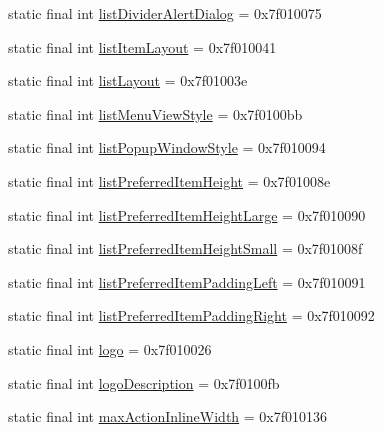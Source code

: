 \begin{CompactItemize}
\item 
static final int \hyperlink{classandroid_1_1support_1_1graphics_1_1drawable_1_1_r_1_1attr_78af25252cbf0570ca0942b1d8a57af0}{listDividerAlertDialog} = 0x7f010075
\item 
static final int \hyperlink{classandroid_1_1support_1_1graphics_1_1drawable_1_1_r_1_1attr_351fa26f9f498f2c645ec7794e1f63a6}{listItemLayout} = 0x7f010041
\item 
static final int \hyperlink{classandroid_1_1support_1_1graphics_1_1drawable_1_1_r_1_1attr_748eaba4836f9fd07dccf78906f08c5b}{listLayout} = 0x7f01003e
\item 
static final int \hyperlink{classandroid_1_1support_1_1graphics_1_1drawable_1_1_r_1_1attr_1b05baff6c902ad44ecb49595c2ac79e}{listMenuViewStyle} = 0x7f0100bb
\item 
static final int \hyperlink{classandroid_1_1support_1_1graphics_1_1drawable_1_1_r_1_1attr_e660de6762e0889d330bdc15f1c2e345}{listPopupWindowStyle} = 0x7f010094
\item 
static final int \hyperlink{classandroid_1_1support_1_1graphics_1_1drawable_1_1_r_1_1attr_83278ad7099882e44e48ab7f94d71b91}{listPreferredItemHeight} = 0x7f01008e
\item 
static final int \hyperlink{classandroid_1_1support_1_1graphics_1_1drawable_1_1_r_1_1attr_ae2a6ff372f951079bfeff924e6a17b1}{listPreferredItemHeightLarge} = 0x7f010090
\item 
static final int \hyperlink{classandroid_1_1support_1_1graphics_1_1drawable_1_1_r_1_1attr_cdfbf9c45b217bb839a51dd07e47289b}{listPreferredItemHeightSmall} = 0x7f01008f
\item 
static final int \hyperlink{classandroid_1_1support_1_1graphics_1_1drawable_1_1_r_1_1attr_65e3427eb7e3d3a86f69fc0db3d0d659}{listPreferredItemPaddingLeft} = 0x7f010091
\item 
static final int \hyperlink{classandroid_1_1support_1_1graphics_1_1drawable_1_1_r_1_1attr_202a65aca6279a02740d7276c224d145}{listPreferredItemPaddingRight} = 0x7f010092
\item 
static final int \hyperlink{classandroid_1_1support_1_1graphics_1_1drawable_1_1_r_1_1attr_8b301a7ff818c7d19748787407aca105}{logo} = 0x7f010026
\item 
static final int \hyperlink{classandroid_1_1support_1_1graphics_1_1drawable_1_1_r_1_1attr_d66cd0a981c98ff2fffccd82d63a6cfa}{logoDescription} = 0x7f0100fb
\item 
static final int \hyperlink{classandroid_1_1support_1_1graphics_1_1drawable_1_1_r_1_1attr_0ad34eaec031cc38dc586160f6fac609}{maxActionInlineWidth} = 0x7f010136

\end{CompactItemize}
